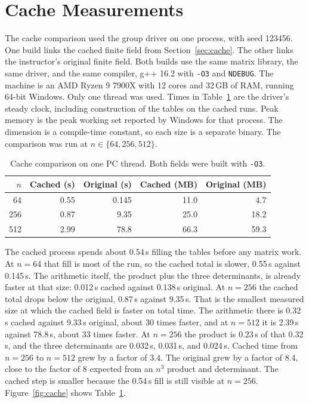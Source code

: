 \section{Cache Measurements}
\label{sec:results}

The cache comparison used the group driver on one process, with seed 123456.
One build links the cached finite field from Section~\ref{sec:cache}.
The other links the instructor's original finite field.
Both builds use the same matrix library, the same driver, and the same compiler, g++ 16.2 with \texttt{-O3} and \texttt{NDEBUG}.
The machine is an AMD Ryzen 9 7900X with 12 cores and 32\,GB of RAM, running 64-bit Windows.
Only one thread was used.
Times in Table~\ref{tab:cache} are the driver's steady clock, including construction of the tables on the cached runs.
Peak memory is the peak working set reported by Windows for that process.
The dimension is a compile-time constant, so each size is a separate binary.
The comparison was run at \(n \in \{64, 256, 512\}\).

\FloatBarrier
\begin{table}[H]
\caption{Cache comparison on one PC thread. Both fields were built with \texttt{-O3}.}
\label{tab:cache}
\centering
\scriptsize
\begin{tabular}{@{}rrrrr@{}}
\toprule
\(n\) & Cached (s) & Original (s) & Cached (MB) & Original (MB) \\
\midrule
64  & 0.55  & 0.145 & 11.0 & 4.7 \\
256 & 0.87  & 9.35  & 25.0 & 18.2 \\
512 & 2.99  & 78.8  & 66.3 & 59.3 \\
\bottomrule
\end{tabular}
\end{table}

The cached process spends about 0.54\,s filling the tables before any matrix work.
At \(n = 64\) that fill is most of the run, so the cached total is slower, 0.55\,s against 0.145\,s.
The arithmetic itself, the product plus the three determinants, is already faster at that size: 0.012\,s cached against 0.138\,s original.
At \(n = 256\) the cached total drops below the original, 0.87\,s against 9.35\,s.
That is the smallest measured size at which the cached field is faster on total time.
The arithmetic there is 0.32\,s cached against 9.33\,s original, about 30 times faster, and at \(n = 512\) it is 2.39\,s against 78.8\,s, about 33 times faster.
At \(n = 256\) the product is 0.23\,s of that 0.32\,s, and the three determinants are 0.032\,s, 0.031\,s, and 0.024\,s.
Cached time from \(n = 256\) to \(n = 512\) grew by a factor of 3.4.
The original grew by a factor of 8.4, close to the factor of 8 expected from an \(n^3\) product and determinant.
The cached step is smaller because the 0.54\,s fill is still visible at \(n = 256\).
Figure~\ref{fig:cache} shows Table~\ref{tab:cache}.

